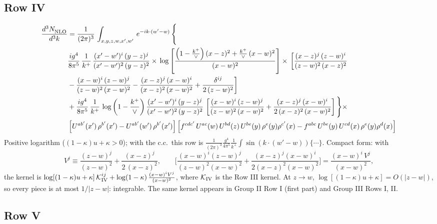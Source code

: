 \documentclass[9pt]{article}
\numberwithin{equation}{section}
\begin{document}
\subsection{Row IV}
\begin{align}
    \frac{d^{3}N_{\rm NLO}^{\rm}}{d^{3}k}  & =   \frac{1}{(2\pi)^{3}}\,
    \int_{x,y,z,w,x',w'}\,e^{-ik\cdot (w^\prime-w)}\,\Bigg\{\notag \\
& \frac{ig^{4}}{8\pi^{5}}\,\frac{1}{k^{+}}\,\frac{(x'-w')^{i}\,(y-z)^{j}}{(x'-w')^{2}\,(y-z)^{2}}\times\,\log{\left[\frac{\left(1-\frac{k^{+}}{\vee}\right)(x-z)^{2}+\frac{k^{+}}{\vee}\,(x-w)^{2}}{(x-w)^{2}}\right]}\times\, \bigg[\frac{(x-z)^{j}\,(z-w)^{i}}{(z-w)^{2}\,(x-z)^{2}}\notag \\ & -\frac{(x-w)^{i}\,(z-w)^{j}}{(z-w)^{2}\,(x-w)^{2}}-\frac{(x-z)^{j}\,(x-w)^{i}}{(x-z)^{2}\,(x-w)^{2}}+\frac{\delta^{ij}}{2\,(z-w)^{2}}\bigg] \notag \\
& + \frac{ig^{4}}{8\pi^{5}}\,\frac{1}{k^{+}}\,\log{\left(1-\frac{k^{+}}{\vee}\right)}\,\frac{(x'-w')^{i}\,(y-z)^{j}}{(x'-w')^{2}\,(y-z)^{2}}\,\left[\frac{(x-w)^{i}\,(z-w)^{j}}{(z-w)^{2}\,(x-w)^{2}}+\frac{(x-z)^{j}\,(x-w)^{i}}{2\, (x-z)^{2}\,(x-w)^{2}}\right]\Bigg\}\times\notag \\ &  \left[U^{ab'}(x')\,\rho^{b'}(x')-U^{ab'}(w')\,\rho^{b'}(x')\right] \left[f^{cdc'}\,U^{ac}(w)\,U^{bd}(z)\,U^{be}(y)\,\rho^{e}(y)\rho^{c'}(x)-f^{abc}\,U^{be}(y)\,U^{cd}(x)\,\rho^{e}(y)\rho^{d}(x)\right]
\end{align}
{\color{red}Positive logarithm ($(1-\kappa)u+\kappa>0$); with the c.c.\ this row is $\frac{1}{(2\pi)^{3}}\frac{g^{4}}{4\pi^{5}}\frac{1}{k^{+}}\int\sin(k\cdot(w'-w))\{\cdots\}$. Compact form: with
\begin{equation}
V^{j}\equiv\frac{(z-w)^{j}}{(z-w)^{2}}+\frac{(x-z)^{j}}{2\,(x-z)^{2}},\qquad
\Big[\frac{(x-w)^{i}(z-w)^{j}}{(z-w)^{2}(x-w)^{2}}+\frac{(x-z)^{j}(x-w)^{i}}{2(x-z)^{2}(x-w)^{2}}\Big]=\frac{(x-w)^{i}\,V^{j}}{(x-w)^{2}},
\end{equation}
the kernel is $\log[(1-\kappa)u+\kappa]\,\mathcal K^{ij}_{\rm IV}+\log(1-\kappa)\,\frac{(x-w)^{i}V^{j}}{(x-w)^{2}}$, where $\mathcal K_{\rm IV}$ is the Row III kernel. At $z\to w$, $\log[(1-\kappa)u+\kappa]=O(|z-w|)$, so every piece is at most $1/|z-w|$: integrable. The same kernel appears in Group II Row I (first part) and Group III Rows I, II.}
\subsection{Row V}
\end{document}
